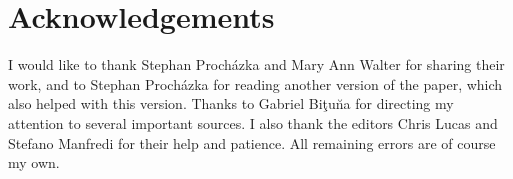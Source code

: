\documentclass[output=paper]{langsci/langscibook}
\begin{document}
\section*{Acknowledgements}
I would like to thank Stephan Proch\'{a}zka and Mary Ann Walter for sharing their work, and to Stephan Proch\'{a}zka for reading another version of the paper, which also helped with this version. Thanks to Gabriel Bi\c{t}u\u{n}a for directing my attention to several important sources. I also thank the editors Chris Lucas and Stefano Manfredi for their help and patience. All remaining errors are of course my own.  

{\sloppy\printbibliography[heading=subbibliography,notkeyword=this]}
\end{document}
